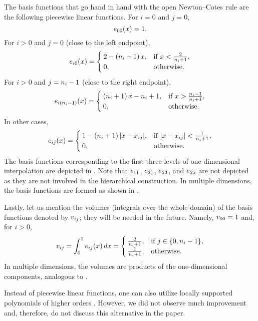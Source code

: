 
The basis functions that go hand in hand with the open Newton--Cotes rule are
the following piecewise linear functions. For $i = 0$ and $j = 0$,
\[
  e_{00}(x) = 1.
\]
For $i > 0$ and $j = 0$ (close to the left endpoint),
\[
  e_{i0}(x) = \begin{cases}
    2 - \left( n_i + 1 \right) x, & \text{if } x < \frac{2}{n_i + 1}, \\
    0, & \text{otherwise}.
  \end{cases}
\]
For $i > 0$ and $j = n_i - 1$ (close to the right endpoint),
\[
  e_{i(n_i - 1)}(x) = \begin{cases}
    \left( n_i + 1 \right) x - n_i + 1, & \text{if } x > \frac{n_i - 1}{n_i + 1}, \\
    0, & \text{otherwise}.
  \end{cases}
\]
In other cases,
\[
  e_{ij}(x) = \begin{cases}
    1 - \left( n_i + 1 \right)|x - x_{ij}|, & \text{if } |x - x_{ij}| < \frac{1}{n_i + 1}, \\
    0, & \text{otherwise}.
  \end{cases}
\]
The basis functions corresponding to the first three levels of one-dimensional
interpolation are depicted in . Note that $e_{11}$, $e_{21}$,
$e_{23}$, and $e_{25}$ are not depicted as they are not involved in the
hierarchical construction. In multiple dimensions, the basis functions are
formed as shown in .

Lastly, let us mention the volumes (integrals over the whole domain) of the
basis functions denoted by $v_{ij}$; they will be needed in the future. Namely,
$v_{00} = 1$ and, for $i > 0$,
\begin{equation} \elab{volume}
  \w_{ij} = \int_0^1 \e_{ij}(\x) \, \d\x = \begin{cases}
    \frac{2}{\n_i + 1}, & \text{if } j \in \{ 0, \n_i - 1 \}, \\
    \frac{1}{\n_i + 1}, & \text{otherwise}.
  \end{cases}
\end{equation}
In multiple dimensions, the volumes are products of the one-dimensional
components, analogous to .

\begin{remark}
Instead of piecewise linear functions, one can also utilize locally supported
polynomials of higher orders \cite{jakeman2012}. However, we did not observe
much improvement and, therefore, do not discuss this alternative in the paper.
\end{remark}
